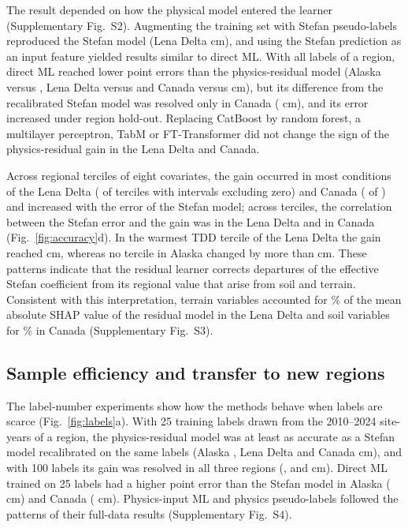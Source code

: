 The result depended on how the physical model entered the learner (Supplementary Fig.~S2). Augmenting the training set with Stefan pseudo-labels reproduced the Stefan model (Lena Delta \ndrefLeblkDo{} cm), and using the Stefan prediction as an input feature yielded results similar to direct ML. With all labels of a region, direct ML reached lower point errors than the physics-residual model (Alaska \nrmseAkblkDz{} versus \nrmseAkblkRo, Lena Delta \nrmseLeblkDz{} versus \nrmseLeblkRo{} and Canada \nrmseCablkDz{} versus \nrmseCablkRo{} cm), but its difference from the recalibrated Stefan model was resolved only in Canada (\ndrefCablkDz{} cm), and its error increased under region hold-out. Replacing CatBoost by random forest, a multilayer perceptron, TabM or FT-Transformer did not change the sign of the physics-residual gain in the Lena Delta and Canada.

Across regional terciles of eight covariates, the gain occurred in most conditions of the Lena Delta (\ngcLesig{} of \ngcLecells{} terciles with intervals excluding zero) and Canada (\ngcCasig{} of \ngcCacells) and increased with the error of the Stefan model; across terciles, the correlation between the Stefan error and the gain was \ngcLecorr{} in the Lena Delta and \ngcCacorr{} in Canada (Fig.~\ref{fig:accuracy}d). In the warmest TDD tercile of the Lena Delta the gain reached \ndtddLewarm{} cm, whereas no tercile in Alaska changed by more than \ngcAkmaxabs{} cm. These patterns indicate that the residual learner corrects departures of the effective Stefan coefficient from its regional value that arise from soil and terrain. Consistent with this interpretation, terrain variables accounted for \nshapLeResTerrain\% of the mean absolute SHAP value of the residual model in the Lena Delta and soil variables for \nshapCaResSoil\% in Canada (Supplementary Fig.~S3).

\subsection{Sample efficiency and transfer to new regions}
The label-number experiments show how the methods behave when labels are scarce (Fig.~\ref{fig:labels}a). With 25 training labels drawn from the 2010--2024 site-years of a region, the physics-residual model was at least as accurate as a Stefan model recalibrated on the same labels (Alaska \nllAkRotwfive, Lena Delta \nllLeRotwfive{} and Canada \nllCaRotwfive{} cm), and with 100 labels its gain was resolved in all three regions (\nllAkRohundred, \nllLeRohundred{} and \nllCaRohundred{} cm). Direct ML trained on 25 labels had a higher point error than the Stefan model in Alaska (\nllAkDztwfive{} cm) and Canada (\nllCaDztwfive{} cm). Physics-input ML and physics pseudo-labels followed the patterns of their full-data results (Supplementary Fig.~S4).


